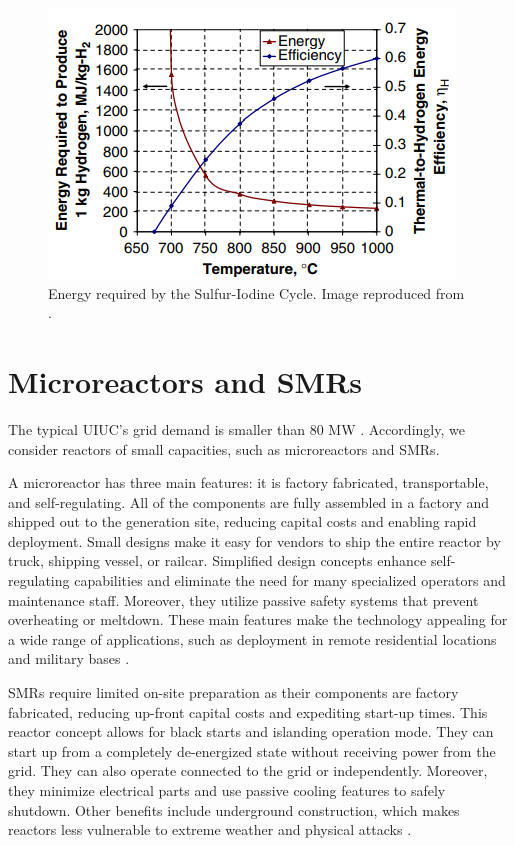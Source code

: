 \documentclass[11pt,letterpaper]{article}
\begin{document}
\begin{figure}[htbp!]
	\centering
	\includegraphics[width=0.6\linewidth]{figures/si-energy.png}
	\hfill
	\caption{Energy required by the Sulfur-Iodine Cycle. Image reproduced from \cite{yildiz_efficiency_2006}.}
	\label{fig:sulfur2}
\end{figure}

\section{Microreactors and \glspl{SMR}}
\label{sec:reactors}

The typical \gls{UIUC}'s grid demand is smaller than 80 MW \cite{dotson_optimal_2020}.
Accordingly, we consider reactors of small capacities, such as microreactors and \glspl{SMR}.

A microreactor has three main features: it is factory fabricated, transportable, and self-regulating.
All of the components are fully assembled in a factory and shipped out to the generation site, reducing capital costs and enabling rapid deployment.
Small designs make it easy for vendors to ship the entire reactor by truck, shipping vessel, or railcar.
Simplified design concepts enhance self-regulating capabilities and eliminate the need for many specialized operators and maintenance staff.
Moreover, they utilize passive safety systems that prevent overheating or meltdown.
These main features make the technology appealing for a wide range of applications, such as deployment in remote residential locations and military bases \cite{us-doe_ultimate_2019}.

\glspl{SMR} require limited on-site preparation as their components are factory fabricated, reducing up-front capital costs and expediting start-up times.
This reactor concept allows for black starts and islanding operation mode.
They can start up from a completely de-energized state without receiving power from the grid.
They can also operate connected to the grid or independently.
Moreover, they minimize electrical parts and use passive cooling features to safely shutdown.
Other benefits include underground construction, which makes reactors less vulnerable to extreme weather and physical attacks \cite{us-doe_ultimate_2019}.
\end{document}
